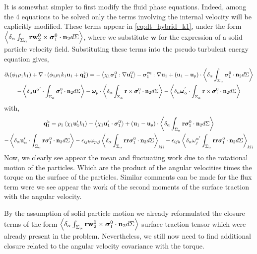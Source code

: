 It is somewhat simpler to first modify the fluid phase equations. 
Indeed, among the 4 equations to be solved only the terms involving the internal velocity will be explicitly modified.  
These terms appear in \ref{eq:dt_hybrid_k1}, under the form $\left<\delta_\alpha \int_{\Sigma_\alpha} {\textbf{rw}_2^0\times\bm{\sigma}_1^0 \cdot \textbf{n}_2} d\Sigma\right>$, where we substitute $\textbf{w}$ for the expression of a solid particle velocity field. 
Substituting these terms into the pseudo turbulent energy equation gives, 
\begin{multline*}
    \partial_t (\phi_1\rho_1k_1)  
    + \mathbf{\nabla}\cdot (
        \phi_1\rho_1k_1\textbf{u}_1
        + \textbf{q}_1^\text{k} 
        )
    = 
    - \left<\chi_1\bm{\sigma}_1^0 : \mathbf{\nabla} \textbf{u}_1^0\right>
    - \bm{\sigma}_1^\text{eq} : \mathbf{\nabla} \textbf{u}_1
    + (\textbf{u}_1 - \textbf{u}_p)
    \cdot \left<\delta_\alpha \int_{\Sigma_\alpha} {\bm{\sigma}_1^0 \cdot \textbf{n}_2} d\Sigma\right>\\
    - \left<\delta_\alpha  \textbf{u}^{\alpha'} \cdot \int_{\Sigma_\alpha}   \bm{\sigma}_1^0 \cdot \textbf{n}_2 d\Sigma\right>
    - \bm{\omega}_{p} \cdot  \left<\delta_\alpha \int_{\Sigma_\alpha} \textbf{r}\times\bm{\sigma}_1^0 \cdot \textbf{n}_2 d\Sigma\right>
    - \left<\delta_\alpha \bm{\omega}^{'}_\alpha  \cdot \int_{\Sigma_\alpha} \textbf{r} \times \bm{\sigma}_1^0 \cdot \textbf{n}_2 d\Sigma\right>
\end{multline*}
with,
\begin{multline*}
    \textbf{q}_1^\text{k}
    = \rho_1 \left<\chi_1 \textbf{u}_1' k_1\right> 
    - \left<\chi_1 \textbf{u}_1' \cdot \bm{\sigma}_1^0\right>
    + (\textbf{u}_1 - \textbf{u}_p)\cdot
    \left<\delta_\alpha \int_{\Sigma_\alpha} {\textbf{r}\bm{\sigma}_1^0 \cdot \textbf{n}_2} d\Sigma\right>
    \\
    - \left<\delta_\alpha  \textbf{u}_\alpha' \cdot \int_{\Sigma_\alpha}  \textbf{r} \bm{\sigma}_1^0 \cdot \textbf{n}_2 d\Sigma\right>
    - \epsilon_{ijk} \omega_{p,j} \left<\delta_\alpha  \int_{\Sigma_\alpha} \textbf{rr}\bm{\sigma}_1^0 \cdot \textbf{n}_2 d\Sigma\right>_{kli}
    - \epsilon_{ijk}\left<\delta_\alpha \omega^{\alpha'}_{j}  \int_{\Sigma_\alpha} \textbf{rr}\bm{\sigma}_1^0 \cdot \textbf{n}_2 d\Sigma\right>_{kli}
\end{multline*}
Now, we clearly see appear the mean and fluctuating work due to the rotational motion of the particles. 
Which are the product of the angular velocities times the torque on the surface of the particles. 
Similar comments can be made for the flux term were we see appear the work of the second moments of the surface traction with the angular velocity. 

By the assumption of solid particle motion we already reformulated the closure terms of the form $\left<\delta_\alpha \int_{\Sigma_\alpha} {\textbf{rw}_2^0\times\bm{\sigma}_1^0 \cdot \textbf{n}_2} d\Sigma\right>$ surface traction tensor which were already present in the problem. 
Nevertheless, we still now need to find additional closure related to the angular velocity covariance with the torque. 

